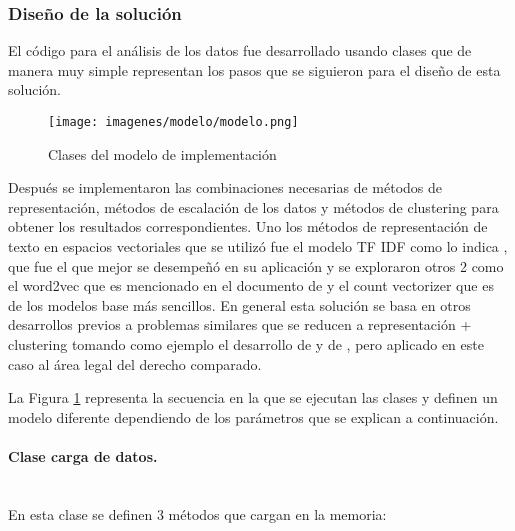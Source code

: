 \documentclass[12pt]{article}
\newcommand{\subsubsubsection}[1]{\paragraph{#1}\mbox{}\\}
\begin{document}
			\subsubsection{Diseño de la solución}				
				El código para el análisis de los datos fue desarrollado usando clases que de manera muy simple representan los pasos que se siguieron para el diseño de esta solución.
							
				\begin{figure}[H]
					\texttt{[image: imagenes/modelo/modelo.png]}
					\centering
					\caption{Clases del modelo de implementación}
					
					\label{fig:modelo_clases}
				\end{figure}			
				
				Después se implementaron las combinaciones necesarias  de métodos de representación, métodos de escalación de los datos y métodos de clustering para obtener los resultados correspondientes.
				Uno los métodos de representación de texto en espacios vectoriales que se utilizó fue el modelo TF IDF como lo indica \cite{Shahmirzadi2019}, que fue el que mejor se desempeñó en su aplicación y se exploraron otros 2 como el word2vec que es mencionado en el documento de \cite{Arnarsson2021} y el count vectorizer que es de los modelos base más sencillos.
				En general esta solución se basa en otros desarrollos previos a problemas similares que se reducen a representación + clustering tomando como ejemplo el desarrollo de \cite{Duan2021} y de \cite{Hadifar2019}, pero aplicado en este caso al área legal del derecho comparado. 
				
				La Figura \ref{fig:modelo_clases} representa la secuencia en la que se ejecutan las clases y definen un modelo diferente dependiendo de los parámetros que se explican a continuación.
				
				\subsubsubsection{Clase carga de datos.}
				En esta clase se definen 3 métodos que cargan en la memoria:
							
\end{document}
